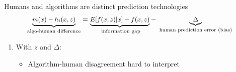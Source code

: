 \documentclass[aspectratio=169,t,11pt,table]{beamer}
\begin{document}
\begin{frame}{Humans and algorithms are distinct prediction technologies}{}\label{conceptframework2}
\vspace{-4mm}
  \begin{equation*}
  \small 
    \underbrace{m(x) - h_i(x,z)}_{\text{algo-human difference}} = \underbrace{E[f(x,z)|x] - f(x,z)}_{\text{ information gap}} - \underbrace{\Delta}_{\text{ human prediction error (bias) }}
\end{equation*} 
\vspace{1mm}


\begin{enumerate} \footnotesize  %
    \item With $z$ and $\Delta$:
        \begin{itemize} \footnotesize
        \item Algorithm-human disagreement hard to interpret
    \end{itemize} 
        \vspace{2mm}
\end{enumerate} 
\end{frame}
\end{document}
